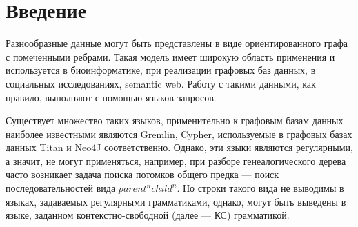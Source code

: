 \documentclass[14pt]{matmex-diploma-custom}
\begin{document}
\maketitle
\tableofcontents

\section*{Введение}
	Разнообразные данные могут быть представлены в виде ориентированного графа с помеченными ребрами. Такая модель имеет широкую область применения и используется в биоинформатике, при реализации графовых баз данных, в социальных исследованиях, semantic web. Работу с такими данными, как правило, выполняют с помощью языков запросов.
	
	Существует множество таких языков, применительно к графовым базам данных наиболее известными являются Gremlin\cite{Gremlin}, Cypher\cite{Cypher}, используемые в графовых базах данных Titan\cite{titan} и Neo4J \cite{neo4j} соответственно. Однако, эти языки являются регулярными, а значит, не могут применяться, например, при разборе генеалогического дерева часто возникает задача поиска потомков общего предка --- поиск последовательностей вида \(parent^nchild^n\). Но строки такого вида не выводимы в языках, задаваемых регулярными грамматиками, однако, могут быть выведены в языке, заданном контекстно-свободной (далее --- КС) грамматикой.  
	
\end{document}
